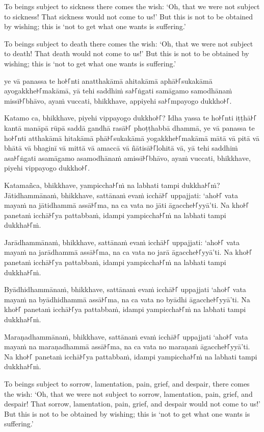 To beings subject to sickness there comes the wish: `Oh, that we were not
subject to sickness! That sickness would not come to us!' But this is not to be
obtained by wishing; this is `not to get what one wants is suffering.'

To beings subject to death there comes the wish: `Oh, that we were not subject
to death! That death would not come to us!' But this is not to be obtained by
wishing; this is `not to get what one wants is suffering.'

\paliPage

ye vā panassa te ho꜔꜒nti anatthakāmā ahitakāmā aphā꜔꜒sukakāmā ayogakkhe꜔꜒makāmā, yā
tehi saddhiṁ sa꜔꜒ṅgati samāgamo samodhānaṁ missī꜔꜒bhāvo, ayaṁ vuccati, bhikkhave,
appiyehi sa꜔꜒mpayogo dukkho꜔꜒.

Katamo ca, bhikkhave, piyehi vippayogo dukkho꜔꜒? Idha yassa te ho꜔꜒nti iṭṭhā꜔꜒ kantā
manāpā rūpā saddā gandhā rasā꜔꜒ phoṭṭhabbā dhammā, ye vā panassa te ho꜔꜒nti
atthakāmā hitakāmā phā꜔꜒sukakāmā yogakkhe꜔꜒makāmā mātā vā pitā vā bhātā vā bhaginī
vā mittā vā amaccā vā ñātisā꜔꜒lohitā vā, yā tehi saddhiṁ asa꜔꜒ṅgati asamāgamo
asamodhānaṁ amissī꜔꜒bhāvo, ayaṁ vuccati, bhikkhave, piyehi vippayogo dukkho꜔꜒.

Katamañca, bhikkhave, yampiccha꜔꜒ṁ na labhati tampi dukkha꜔꜒ṁ? Jātidhammānaṁ,
bhikkhave, sattānaṁ evaṁ icchā꜔꜒ uppajjati: ‘aho꜔꜒ vata mayaṁ na jātidhammā assā꜔꜒ma,
na ca vata no jāti āgacche꜔꜒yyā’ti. Na kho꜔꜒ panetaṁ icchā꜔꜒ya pattabbaṁ, idampi
yampiccha꜔꜒ṁ na labhati tampi dukkha꜔꜒ṁ.

Jarādhammānaṁ, bhikkhave, sattānaṁ evaṁ icchā꜔꜒ uppajjati: ‘aho꜔꜒ vata mayaṁ na
jarādhammā assā꜔꜒ma, na ca vata no jarā āgacche꜔꜒yyā’ti. Na kho꜔꜒ panetaṁ icchā꜔꜒ya
pattabbaṁ, idampi yampiccha꜔꜒ṁ na labhati tampi dukkha꜔꜒ṁ.

Byādhidhammānaṁ, bhikkhave, sattānaṁ evaṁ icchā꜔꜒ uppajjati ‘aho꜔꜒ vata mayaṁ na
byādhidhammā assā꜔꜒ma, na ca vata no byādhi āgacche꜔꜒yyā’ti. Na kho꜔꜒ panetaṁ icchā꜔꜒ya
pattabbaṁ, idampi yampiccha꜔꜒ṁ na labhati tampi dukkha꜔꜒ṁ.

Maraṇadhammānaṁ, bhikkhave, sattānaṁ evaṁ icchā꜔꜒ uppajjati ‘aho꜔꜒ vata mayaṁ na
maraṇadhammā assā꜔꜒ma, na ca vata no maraṇaṁ āgacche꜔꜒yyā’ti. Na kho꜔꜒ panetaṁ icchā꜔꜒ya
pattabbaṁ, idampi yampiccha꜔꜒ṁ na labhati tampi dukkha꜔꜒ṁ.

\englishPage

To beings subject to sorrow, lamentation, pain, grief, and despair, there comes
the wish: `Oh, that we were not subject to sorrow, lamentation, pain, grief, and
despair! That sorrow, lamentation, pain, grief, and despair would not come to
us!' But this is not to be obtained by wishing; this is `not to get what one
wants is suffering.'

